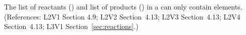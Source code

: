 The list of reactants () and list of products
() in a \Reaction can only contain
 elements.  (References: L2V1 Section 4.9; L2V2
Section~4.13; L2V3 Section~4.13; L2V4 Section~4.13; L3V1 Section~\ref{sec:reactions}.)
